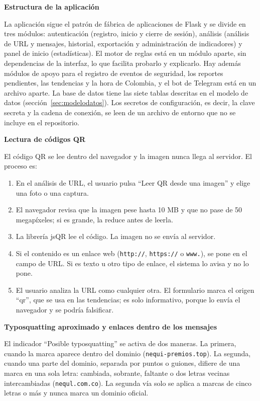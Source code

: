 \documentclass[journal,onecolumn,12pt,draftclsnofoot]{IEEEtran}
\newcommand{\apartado}[1]{\par\medskip\noindent\textbf{#1}\par\smallskip}
\begin{document}
\apartado{Estructura de la aplicación}

La aplicación sigue el patrón de fábrica de aplicaciones de Flask y se divide en tres módulos: autenticación (registro, inicio y cierre de sesión), análisis (análisis de URL y mensajes, historial, exportación y administración de indicadores) y panel de inicio (estadísticas). El motor de reglas está en un módulo aparte, sin dependencias de la interfaz, lo que facilita probarlo y explicarlo. Hay además módulos de apoyo para el registro de eventos de seguridad, los reportes pendientes, las tendencias y la hora de Colombia, y el bot de Telegram está en un archivo aparte. La base de datos tiene las siete tablas descritas en el modelo de datos (sección~\ref{sec:modelodatos}). Los secretos de configuración, es decir, la clave secreta y la cadena de conexión, se leen de un archivo de entorno que no se incluye en el repositorio.

\apartado{Lectura de códigos QR}

El código QR se lee dentro del navegador y la imagen nunca llega al servidor. El proceso es:

\begin{enumerate}
  \item En el análisis de URL, el usuario pulsa ``Leer QR desde una imagen'' y elige una foto o una captura.
  \item El navegador revisa que la imagen pese hasta 10 MB y que no pase de 50 megapíxeles; si es grande, la reduce antes de leerla.
  \item La librería jsQR \cite{jsqr} lee el código. La imagen no se envía al servidor.
  \item Si el contenido es un enlace web (\texttt{http://}, \texttt{https://} o \texttt{www.}), se pone en el campo de URL. Si es texto u otro tipo de enlace, el sistema lo avisa y no lo pone.
  \item El usuario analiza la URL como cualquier otra. El formulario marca el origen ``qr'', que se usa en las tendencias; es solo informativo, porque lo envía el navegador y se podría falsificar.
\end{enumerate}

\apartado{Typosquatting aproximado y enlaces dentro de los mensajes}

El indicador ``Posible typosquatting'' se activa de dos maneras. La primera, cuando la marca aparece dentro del dominio (\texttt{nequi-premios.top}). La segunda, cuando una parte del dominio, separada por puntos o guiones, difiere de una marca en una sola letra: cambiada, sobrante, faltante o dos letras vecinas intercambiadas (\texttt{nequl.com.co}). La segunda vía solo se aplica a marcas de cinco letras o más y nunca marca un dominio oficial.
\end{document}
